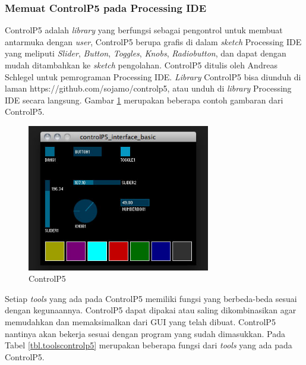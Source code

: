 \subsubsection{ Memuat ControlP5 pada Processing IDE }
ControlP5 adalah \textit{library} yang berfungsi sebagai pengontrol untuk membuat antarmuka dengan \textit{user}, ControlP5 berupa grafis di dalam \textit{sketch} Processing IDE yang meliputi \textit{Slider}, \textit{Button}, \textit{Toggles}, \textit{Knobs}, \textit{Radiobutton}, dan dapat dengan mudah ditambahkan ke \textit{sketch} pengolahan. ControlP5 ditulis oleh Andreas Schlegel untuk pemrograman Processing IDE. \textit{Library} ControlP5 bisa diunduh di laman https://github.com/sojamo/controlp5, atau unduh di \textit{library} Processing IDE secara langsung. Gambar \ref{pic.controlp5} merupakan beberapa contoh gambaran dari ControlP5.
	\begin{figure}[H]
	\centering
	\includegraphics[width=8cm]{gambar/controlp5.jpg}
	\caption{ControlP5}
	\label{pic.controlp5}
\end{figure}
Setiap \textit{tools} yang ada pada ControlP5 memiliki fungsi yang berbeda-beda sesuai dengan kegunaannya. ControlP5 dapat dipakai atau saling dikombinasikan agar memudahkan dan memaksimalkan dari GUI yang telah dibuat. ControlP5 nantinya akan bekerja sesuai dengan program yang sudah dimasukkan. Pada Tabel \ref{tbl.toolscontrolp5} merupakan beberapa fungsi dari \textit{tools} yang ada pada ControlP5.
